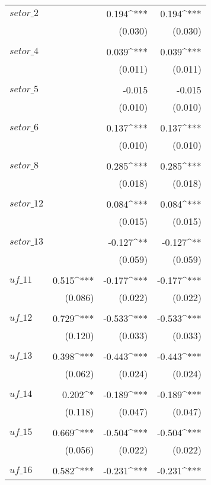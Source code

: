 \begin{apendicesenv}
\begin{longtable}{@{\extracolsep{5pt}}lD{.}{.}{-3} D{.}{.}{-3} D{.}{.}{-3} }
	   $setor\_2$ &  & 0.194^{***} & 0.194^{***} \\ 
		&  & (0.030) & (0.030) \\
		& & & \\
	   $setor\_4$ &  & 0.039^{***} & 0.039^{***} \\
		&  & (0.011) & (0.011) \\
		& & & \\
	   $setor\_5$ &  & -0.015 & -0.015 \\
		&  & (0.010) & (0.010) \\
		& & & \\
	   $setor\_6$ &  & 0.137^{***} & 0.137^{***} \\
		&  & (0.010) & (0.010) \\ 
		& & & \\
	   $setor\_8$ &  & 0.285^{***} & 0.285^{***} \\
		&  & (0.018) & (0.018) \\
		& & & \\
	   $setor\_12$ &  & 0.084^{***} & 0.084^{***} \\
		&  & (0.015) & (0.015) \\
		& & & \\
	   $setor\_13$ &  & -0.127^{**} & -0.127^{**} \\
		&  & (0.059) & (0.059) \\
		& & & \\
	   $uf\_11$ & 0.515^{***} & -0.177^{***} & -0.177^{***} \\ 
		& (0.086) & (0.022) & (0.022) \\
		& & & \\
	   $uf\_12$ & 0.729^{***} & -0.533^{***} & -0.533^{***} \\
		& (0.120) & (0.033) & (0.033) \\
		& & & \\
	   $uf\_13$ & 0.398^{***} & -0.443^{***} & -0.443^{***} \\
		& (0.062) & (0.024) & (0.024) \\
		& & & \\
	   $uf\_14$ & 0.202^{*} & -0.189^{***} & -0.189^{***} \\
		& (0.118) & (0.047) & (0.047) \\ 
		& & & \\
	   $uf\_15$ & 0.669^{***} & -0.504^{***} & -0.504^{***} \\
		& (0.056) & (0.022) & (0.022) \\
		& & & \\
	   $uf\_16$ & 0.582^{***} & -0.231^{***} & -0.231^{***} \\

\end{longtable}
\end{apendicesenv}
